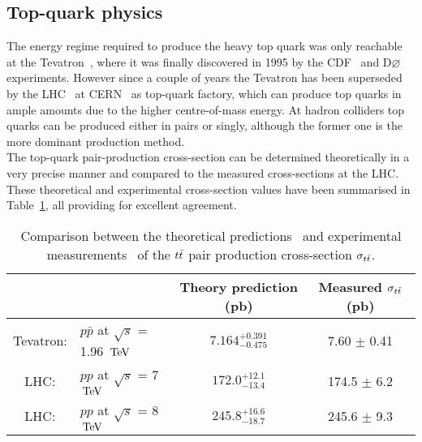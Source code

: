 \subsection{Top-quark physics} 
The energy regime required to produce the heavy top quark was only reachable at the Tevatron~\cite{Tevatron}, where it was finally discovered in 1995 by the CDF~\cite{CDF} and D$\varnothing$~\cite{D0} experiments. However since a couple of years the Tevatron has been superseded by the LHC~\cite{} at CERN~\cite{CERN} as top-quark factory, which can produce top quarks in ample amounts due to the higher centre-of-mass energy. %
At hadron colliders top quarks can be produced either in pairs or singly, although the former one is the more dominant production method.
\\
The top-quark pair-production cross-section can be determined theoretically in a very precise manner and compared to the measured cross-sections at the LHC. These theoretical and experimental cross-section values have been summarised in Table~\ref{table::XSTopPair}, all providing for excellent agreement. %
\begin{table}[h!t]
 \centering
 \caption{Comparison between the theoretical predictions~\cite{CzakonTopPairXS, CzakonGluonPDF} and experimental measurements~\cite{TevatronTTbarXS, CMSTTbarXS} of the $t\bar{t}$ pair production cross-section $\sigma_{t\bar{t}}$.} \label{table::XSTopPair}
 \begin{tabular}{|cl|c|c|}
  \hline
		&						& Theory prediction (pb) 	& Measured $\sigma_{t\bar{t}}$ (pb) 	\\
  \hline						
  Tevatron: 	& $p\bar{p}$ at $\sqrt{s}$ = 1.96 $\, \mathrm{TeV}$ 	& $7.164^{+0.391}_{-0.475}$	& 7.60 $\pm$ 0.41			\\
  LHC: 		& $pp$ at $\sqrt{s}$ = 7 $\, \mathrm{TeV}$ 		& $172.0^{+12.1}_{-13.4}$	& 174.5 $\pm$ 6.2			\\
  LHC: 		& $pp$ at $\sqrt{s}$ = 8 $\, \mathrm{TeV}$ 		& $245.8^{+16.6}_{-18.7}$	& 245.6 $\pm$ 9.3			\\
  \hline
 \end{tabular}
\end{table}

